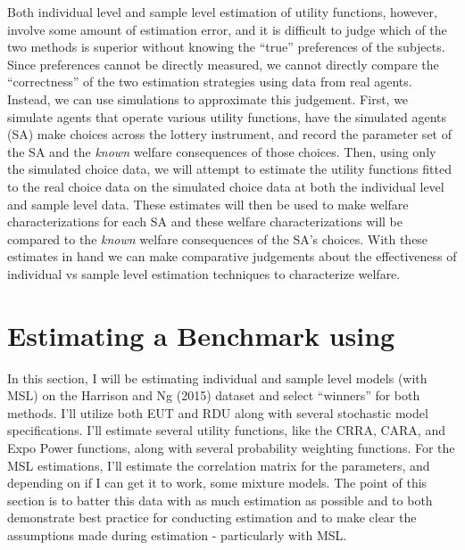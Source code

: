 \documentclass[../main.tex]{subfiles}
\begin{document}
\addtocounter{footnote}{-1}

Both individual level and sample level estimation of utility functions, however, involve some amount of estimation error, and it is difficult to judge which of the two methods is superior without knowing the \enquote{true} preferences of the subjects.
Since preferences cannot be directly measured, we cannot directly compare the \enquote{correctness} of the two estimation strategies using data from real agents.
Instead, we can use simulations to approximate this judgement.
First, we simulate agents that operate various utility functions, have the simulated agents (SA) make choices across the \textcite{Harrison2015} lottery instrument, and record the parameter set of the SA and the \textit{known} welfare consequences of those choices.
Then, using only the simulated choice data, we will attempt to estimate the utility functions fitted to the real choice data on the simulated choice data at both the individual level and sample level data.
These estimates will then be used to make welfare characterizations for each SA and these welfare characterizations will be compared to the \textit{known} welfare consequences of the SA's choices.
With these estimates in hand we can make comparative judgements about the effectiveness of individual vs sample level estimation techniques to characterize welfare.

\section{Estimating a Benchmark using \texorpdfstring{\textcite{Harrison2015}}{Harrison and Ng (2015)}}

In this section, I will be estimating individual and sample level models (with MSL) on the Harrison and Ng (2015) dataset and select \enquote{winners} for both methods.
I'll utilize both EUT and RDU along with several stochastic model specifications.
I'll estimate several utility functions, like the CRRA, CARA, and Expo Power functions, along with several probability weighting functions.
For the MSL estimations, I'll estimate the correlation matrix for the parameters, and depending on if I can get it to work, some mixture models.
The point of this section is to batter this data with as much estimation as possible and to both demonstrate best practice for conducting estimation and to make clear the assumptions made during estimation - particularly with MSL.
\end{document}
